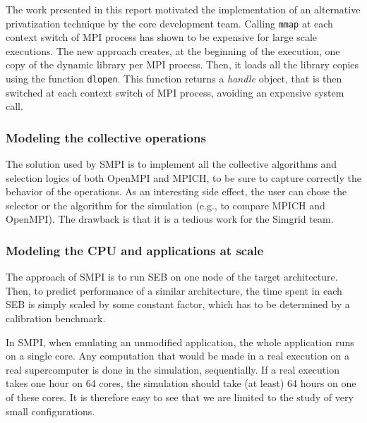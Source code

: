 \documentclass[12pt, a4paper]{memoir}
\begin{document}
The work presented in this report motivated the implementation of an alternative privatization technique by the
core development team. Calling \texttt{mmap} at each context switch of MPI process has shown to be expensive for large scale
executions. The new approach creates, at the beginning of the execution, one copy of the dynamic library per MPI
process. Then, it loads all the library copies using the function \texttt{dlopen}. This function returns a \emph{handle} object,
that is then switched at each context switch of MPI process, avoiding an expensive system call.
\subsubsection{Modeling the collective operations}
\label{sec:org16f1083}
The solution used by SMPI is to implement all the collective algorithms and selection logics of both OpenMPI and
MPICH, to be sure to capture correctly the behavior of the operations. As an interesting side effect, the
user can chose the selector or the algorithm for the simulation (e.g., to compare MPICH and OpenMPI). The drawback
is that it is a tedious work for the Simgrid team.
\subsubsection{Modeling the CPU and applications at scale}
\label{sec:org1d1c791}
The approach of SMPI is to run SEB on one node of the target architecture. Then, to predict performance of a
similar architecture, the time spent in each SEB is simply scaled by some constant factor, which has to be
determined by a calibration benchmark.

In SMPI, when emulating an unmodified application, the whole application runs on a single core. Any computation
that would be made in a real execution on a real supercomputer is done in the simulation, sequentially. If a real
execution takes one hour on 64 cores, the simulation should take (at least) 64 hours on one of these cores. It is
therefore easy to see that we are limited to the study of very small configurations.
\end{document}
